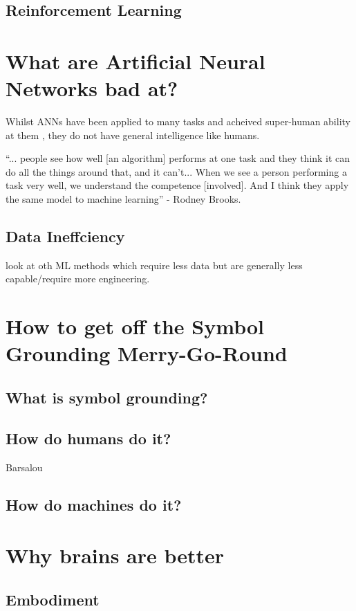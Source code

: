 \subsection{Reinforcement Learning}


\section{What are Artificial Neural Networks bad at?}
Whilst ANNs have been applied to many tasks and acheived super-human ability at them \cite{vinyals2019alphastar}, they do not have general intelligence like humans.

\begin{displayquote}
``... people see how well [an algorithm] performs at one task and they think it can do all the things around that, and it can’t... When we see a person performing a task very well, we understand the competence [involved]. And I think they apply the same model to machine learning'' - Rodney Brooks.
\end{displayquote}
\subsection{Data Ineffciency}
look at oth ML methods which require less data but are generally less capable/require more engineering.


\section{How to get off the Symbol Grounding Merry-Go-Round} 
\subsection{What is symbol grounding?}
\subsection{How do humans do it?}
Barsalou

\subsection{How do machines do it?}

\section{Why brains are better}
\subsection{Embodiment}
